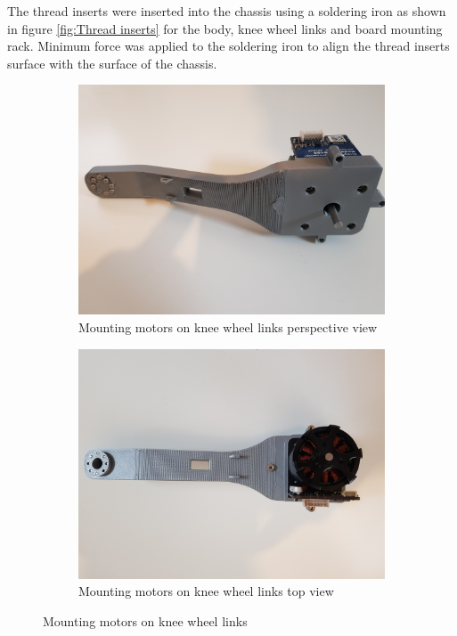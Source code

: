 The thread inserts were inserted into the chassis using a soldering iron as shown in figure \ref{fig:Thread inserts} for the body, knee wheel links and board mounting rack.
Minimum force was applied to the soldering iron to align the thread inserts surface with the surface of the chassis.
\begin{figure}[h]
	\centering
	\begin{subfigure}[t]{0.45\textwidth}
		\includegraphics[height=0.7\textwidth]{mounting_motors_on_knee_wheel_links_1}
		\caption{Mounting motors on knee wheel links perspective view}
		\label{fig:mountingmotorsonkneewheellinksperpectiveview}
	\end{subfigure}
	\begin{subfigure}[t]{0.45\textwidth}
		\includegraphics[height=0.7\textwidth]{mounting_motors_on_knee_wheel_links_2}
		\caption{Mounting motors on knee wheel links top view}
		\label{fig:mountingmotorsonkneewheellinkstopview}
	\end{subfigure}
	\caption{Mounting motors on knee wheel links}
	\label{fig:Mounting motors on knee wheel links}
\end{figure}

